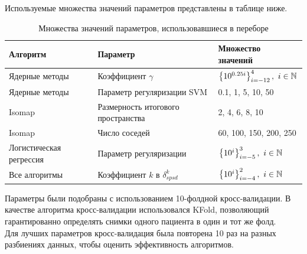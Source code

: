 \indent Используемые множества значений параметров представлены в таблице ниже.\\
 
\begin{table}[!h]
\centering
\begin{tabular}{lll}
\hline
\rowcolor[HTML]{EFEFEF} 
Алгоритм                & Параметр                            & Множество значений                                                                                                                                                                                                        \\ \hline
Ядерные методы          & Коэффициент $\gamma$                & $\left\{ 10^{0.25i} \right\}_{i=-12}^4, \ i\in \mathbb{N}$
     \\ 
Ядерные методы          & Параметр регуляризации SVM          & 0.1, 1, 5, 10, 50                                                                                                                                                                                                         \\
Isomap                  & Размерность итогового пространства  & 2, 4, 6, 8, 10                                                                                                                                                                                                            \\
Isomap                  & Число соседей                       & 60, 100, 150, 200, 250                                                                                                                                                                                                    \\
Логистическая регрессия & Параметр регуляризации              & $\left\{ 10^{i} \right\}_{i=-5}^3, \ i \in \mathbb{N} $                                                                                                                                                                      \\
Все алгоритмы           & Коэффициент $k$ в $\delta_{spsd}^k$ & $\left\{ 10^i \right\}_{i=-4}^2, \ i \in \mathbb{N}$ 
\end{tabular}
\caption{Множества значений параметров, использовавшиеся в переборе}
\end{table}

\indent Параметры были подобраны с использованием 10-фолдной кросс-валидации. В качестве алгоритма кросс-валидации использовался KFold, позволяющий гарантированно определять снимки одного пациента в один и тот же фолд. \\
Для лучших параметров кросс-валидация была повторена 10 раз на разных разбиениях данных, чтобы оценить эффективность алгоритмов.

